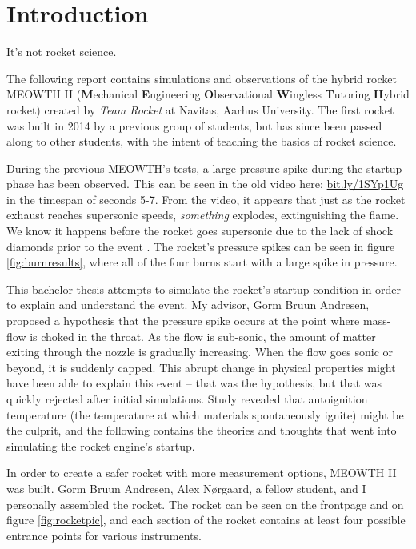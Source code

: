 \chapter{Introduction}

It's not rocket science.

The following report contains simulations and observations of the hybrid rocket MEOWTH II (\textbf{M}echanical \textbf{E}ngineering \textbf{O}bservational \textbf{W}ingless \textbf{T}utoring \textbf{H}ybrid rocket) created by \emph{Team Rocket} \cite{bulba} at Navitas, Aarhus University. The first rocket was built in 2014 by a previous group of students, but has since been passed along to other students, with the intent of teaching the basics of rocket science.


During the previous MEOWTH's tests, a large pressure spike during the startup phase has been observed. This can be seen in the old video here: \url{bit.ly/1SYp1Ug} in the timespan of seconds 5-7. From the video, it appears that just as the rocket exhaust reaches supersonic speeds, \emph{something} explodes, extinguishing the flame. We know it happens before the rocket goes supersonic due to the lack of shock diamonds prior to the event \cite{rockProp}. The rocket's pressure spikes can be seen in figure \ref{fig:burnresults}, where all of the four burns start with a large spike in pressure.


This bachelor thesis attempts to simulate the rocket's startup condition in order to explain and understand the event. My advisor, Gorm Bruun Andresen, proposed a hypothesis that the pressure spike occurs at the point where mass-flow is choked in the throat. As the flow is sub-sonic, the amount of matter exiting through the nozzle is gradually increasing. When the flow goes sonic or beyond, it is suddenly capped. This abrupt change in physical properties might have been able to explain this event -- that was the hypothesis, but that was quickly rejected after initial simulations. Study revealed that autoignition temperature (the temperature at which materials spontaneously ignite) might be the culprit, and the following contains the theories and thoughts that went into simulating the rocket engine's startup.


In order to create a safer rocket with more measurement options, MEOWTH II was built. Gorm Bruun Andresen, Alex Nørgaard, a fellow student, and I personally assembled the rocket. The rocket can be seen on the frontpage and on figure \ref{fig:rocketpic}, and each section of the rocket contains at least four possible entrance points for various instruments.


